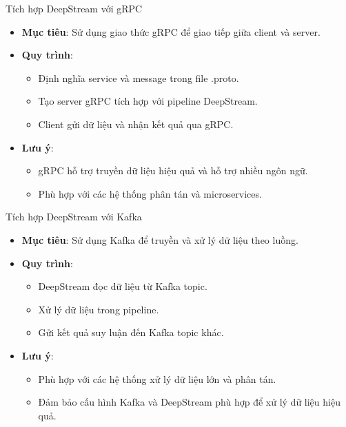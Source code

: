 \documentclass{beamer}
\begin{document}
\begin{frame}{Tích hợp DeepStream với gRPC}
    \begin{itemize}
        \item \textbf{Mục tiêu}: Sử dụng giao thức gRPC để giao tiếp giữa client và server.
        \item \textbf{Quy trình}:
        \begin{itemize}
            \item Định nghĩa service và message trong file .proto.
            \item Tạo server gRPC tích hợp với pipeline DeepStream.
            \item Client gửi dữ liệu và nhận kết quả qua gRPC.
        \end{itemize}
        \item \textbf{Lưu ý}:
        \begin{itemize}
            \item gRPC hỗ trợ truyền dữ liệu hiệu quả và hỗ trợ nhiều ngôn ngữ.
            \item Phù hợp với các hệ thống phân tán và microservices.
        \end{itemize}
    \end{itemize}
\end{frame}

\begin{frame}{Tích hợp DeepStream với Kafka}
    \begin{itemize}
        \item \textbf{Mục tiêu}: Sử dụng Kafka để truyền và xử lý dữ liệu theo luồng.
        \item \textbf{Quy trình}:
        \begin{itemize}
            \item DeepStream đọc dữ liệu từ Kafka topic.
            \item Xử lý dữ liệu trong pipeline.
            \item Gửi kết quả suy luận đến Kafka topic khác.
        \end{itemize}
        \item \textbf{Lưu ý}:
        \begin{itemize}
            \item Phù hợp với các hệ thống xử lý dữ liệu lớn và phân tán.
            \item Đảm bảo cấu hình Kafka và DeepStream phù hợp để xử lý dữ liệu hiệu quả.
        \end{itemize}
    \end{itemize}
\end{frame}
    
    
\end{document}

